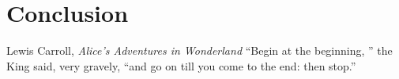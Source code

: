 \chapter{Conclusion}
\begin{chapquote}{Lewis Carroll, \textit{Alice's Adventures in Wonderland}}
``Begin at the beginning, '' the King said, very gravely, ``and go on till you come to the end: then stop.''
\end{chapquote}